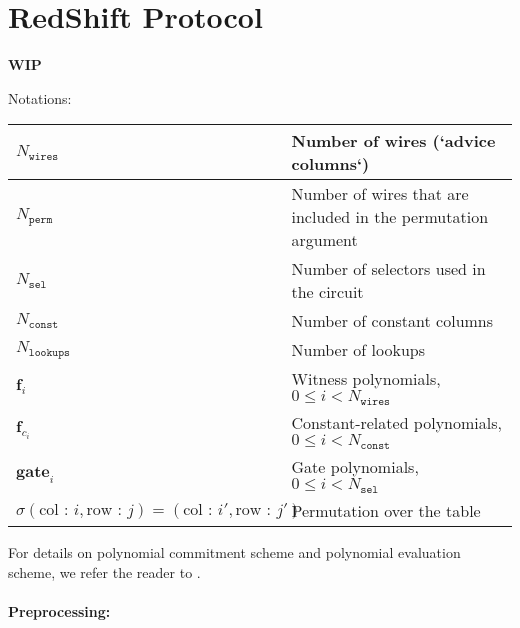 \section{RedShift Protocol}
\label{section:protocol}
\textbf{WIP}

Notations:

\begin{center}
\begin{table}[H]
\begin{tabular}{| l | l |}
 	\hline
	$N_{\texttt{wires}}$ & Number of wires (`advice columns`) \\
	\hline
	$N_{\texttt{perm}}$ & Number of wires that are included in the permutation argument \\
	\hline
	$N_{\texttt{sel}}$ & Number of selectors used in the circuit \\
	\hline
	$N_{\texttt{const}}$ & Number of constant columns  \\
	\hline 
	$N_{\texttt{lookups}}$ & Number of lookups \\
	\hline
	$\textbf{f}_i$ & Witness polynomials, $0 \leq i < N_{\texttt{wires}}$  \\
	\hline
	$\textbf{f}_{c_i}$ & Constant-related polynomials, $0 \leq i < N_{\texttt{const}}$  \\
	\hline
	$\textbf{gate}_i$ & Gate polynomials, $0 \leq i < N_{\texttt{sel}}$  \\
	\hline
	$\sigma(\text{col : } i, \text{row : } j) = (\text{col : } i', \text{row : } j')$ & Permutation over the table \\
	\hline
\end{tabular}
\end{table}
\end{center}

For details on polynomial commitment scheme and polynomial evaluation scheme, we refer the reader to \cite{cryptoeprint:2019:1400}.

\paragraph{Preprocessing:}



